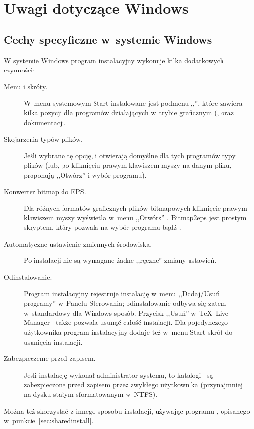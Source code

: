 \documentclass{article}
\begin{document}
\section{Uwagi dotyczące Windows}
\label{sec:windows}

\subsection{Cechy specyficzne w~systemie Windows}
\label{sec:winfeatures}

W systemie Windows program instalacyjny wykonuje kilka dodatkowych czynności:
\begin{description}
\item[Menu i skróty.]
W~menu systemowym Start  instalowane jest podmenu ,,\TL'',
 które zawiera kilka pozycji dla programów działających w~trybie graficznym
 (, %
  oraz dokumentacji.
\item[Skojarzenia typów plików.] Jeśli wybrano tę opcję,
  i   otwierają domyślne
  dla tych programów typy plików (lub, po kliknięciu prawym klawiszem
  myszy na danym pliku, proponują ,,Otwórz'' i wybór programu).
\item[Konwerter bitmap do EPS.] Dla różnych formatów graficznych plików
 bitmapowych kliknięcie prawym klawiszem myszy wyświetla w~menu ,,Otwórz''
 . Bitmap2eps jest prostym skryptem, który pozwala
 na wybór programu  bądź .
\item[Automatyczne ustawienie zmiennych środowiska.]
 Po instalacji nie są wymagane żadne ,,ręczne'' zmiany ustawień.
\item[Odinstalowanie.]  Program instalacyjny rejestruje instalację
w~menu ,,Dodaj/Usuń programy'' w~Panelu Sterowania; odinstalowanie
odbywa się  zatem w~standardowy dla Windows sposób. Przycisk ,,Usuń''
w~\TeX\ Live Manager \GUI\ także  pozwala usunąć całość instalacji.
Dla pojedynczego użytkownika program instalacyjny dodaje też w~menu Start
skrót do usunięcia instalacji.
\item[Zabezpieczenie przed zapisem.] Jeśli instalację wykonał
administrator systemu, to katalogi \TL\ są zabezpieczone przed zapisem przez
zwykłego użytkownika (przynajmniej na dysku stałym sformatowanym w~NTFS).
\end{description}

Można też skorzystać z innego sposobu instalacji, używając  programu ,
opisanego w~punkcie~\ref{sec:sharedinstall}.
\end{document}
